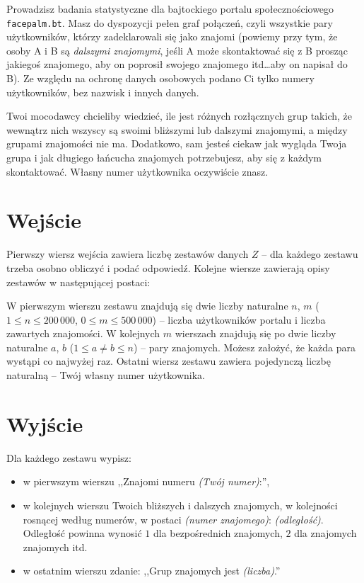 \documentclass{spiral-kurs}
\begin{document}
\makeheader
%
  
Prowadzisz badania statystyczne dla bajtockiego portalu społecznościowego \texttt{facepalm.bt}. Masz do dyspozycji pełen graf połączeń, czyli wszystkie pary użytkowników, którzy zadeklarowali się jako znajomi (powiemy przy tym, że osoby A i B są \textit{dalszymi znajomymi}, jeśli A może skontaktować się z B prosząc jakiegoś znajomego, aby on poprosił swojego znajomego itd\ldots aby on napisał do B). Ze względu na ochronę danych osobowych podano Ci tylko numery użytkowników, bez nazwisk i innych danych.

Twoi mocodawcy chcieliby wiedzieć, ile jest różnych rozłącznych grup takich, że wewnątrz nich wszyscy są swoimi bliższymi lub dalszymi znajomymi, a między grupami znajomości nie ma. Dodatkowo, sam jesteś ciekaw jak wygląda Twoja grupa i jak długiego łańcucha znajomych potrzebujesz, aby się z każdym skontaktować. Własny numer użytkownika oczywiście znasz.


    \section{Wejście}

Pierwszy wiersz wejścia zawiera liczbę zestawów danych $Z$ -- dla każdego zestawu trzeba osobno obliczyć i podać odpowiedź. Kolejne wiersze zawierają opisy zestawów w następującej postaci:

W pierwszym wierszu zestawu znajdują się dwie liczby naturalne $n$, $m$ ($1 \leq n \leq 200\,000$, $0 \leq m \leq 500\,000$) -- liczba użytkowników portalu i liczba zawartych znajomości. W kolejnych $m$ wierszach znajdują się po dwie liczby naturalne $a$, $b$ ($1 \leq a \neq b \leq n$) -- pary znajomych. Możesz założyć, że każda para wystąpi co najwyżej raz. Ostatni wiersz zestawu zawiera pojedynczą liczbę naturalną -- Twój własny numer użytkownika.
      
    \section{Wyjście}

Dla każdego zestawu wypisz:
\begin{itemize}
\item w pierwszym wierszu ,,Znajomi numeru \textit{(Twój numer)}:'',
\item w kolejnych wierszu Twoich bliższych i dalszych znajomych, w kolejności rosnącej według numerów, w postaci \textit{(numer znajomego)}: \textit{(odległość)}. Odległość powinna wynosić $1$ dla bezpośrednich znajomych, $2$ dla znajomych znajomych itd.
\item w ostatnim wierszu zdanie: ,,Grup znajomych jest \textit{(liczba)}.''
\end{itemize}


  
\end{document}
